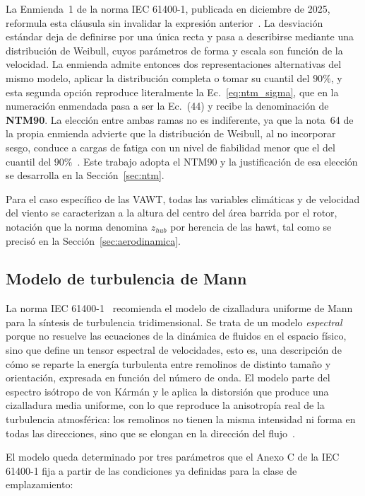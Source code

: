 La Enmienda~1 de la norma IEC 61400-1, publicada en diciembre de 2025, reformula esta cláusula sin invalidar la expresión anterior~\parencite*{IEC61400-1-AMD1}. La desviación estándar deja de definirse por una única recta y pasa a describirse mediante una distribución de Weibull, cuyos parámetros de forma y escala son función de la velocidad. La enmienda admite entonces dos representaciones alternativas del mismo modelo, aplicar la distribución completa o tomar su cuantil del $90\%$, y esta segunda opción reproduce literalmente la Ec.~\ref{eq:ntm_sigma}, que en la numeración enmendada pasa a ser la Ec.~(44) y recibe la denominación de \textbf{NTM90}. La elección entre ambas ramas no es indiferente, ya que la nota~64 de la propia enmienda advierte que la distribución de Weibull, al no incorporar sesgo, conduce a cargas de fatiga con un nivel de fiabilidad menor que el del cuantil del $90\%$~\parencite{IEC61400-1-AMD1}. Este trabajo adopta el NTM90 y la justificación de esa elección se desarrolla en la Sección~\ref{sec:ntm}.

Para el caso específico de las VAWT, todas las variables climáticas y de velocidad del viento se caracterizan a la altura del centro del área barrida por el rotor, notación que la norma denomina $z_{hub}$ por herencia de las \gls{hawt}, tal como se precisó en la Sección~\ref{sec:aerodinamica}.

\subsection{Modelo de turbulencia de Mann}
\label{sec:modelo_mann}

La norma IEC 61400-1~\parencite*{IEC61400-1} recomienda el modelo de cizalladura uniforme de Mann~\parencite{Mann1994} para la síntesis de turbulencia tridimensional. Se trata de un modelo \textit{espectral} porque no resuelve las ecuaciones de la dinámica de fluidos en el espacio físico, sino que define un tensor espectral de velocidades, esto es, una descripción de cómo se reparte la energía turbulenta entre remolinos de distinto tamaño y orientación, expresada en función del número de onda. El modelo parte del espectro isótropo de von Kármán y le aplica la distorsión que produce una cizalladura media uniforme, con lo que reproduce la anisotropía real de la turbulencia atmosférica: los remolinos no tienen la misma intensidad ni forma en todas las direcciones, sino que se elongan en la dirección del flujo~\parencite{IEC61400-1}.

El modelo queda determinado por tres parámetros que el Anexo C de la IEC 61400-1 fija a partir de las condiciones ya definidas para la clase de emplazamiento:

